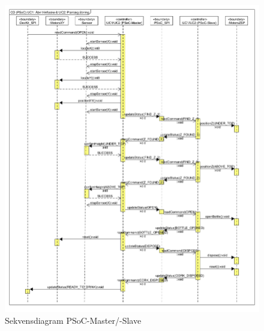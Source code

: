 \begin{figure}[H]
	\centerline{\includegraphics[scale=0.4]{tex/Arkitektur/Fotos/SW/Sekvendiagram_PSoC}}
	\caption{Sekvensdiagram PSoC-Master/-Slave}
	\label{SD_PSoC}
\end{figure}